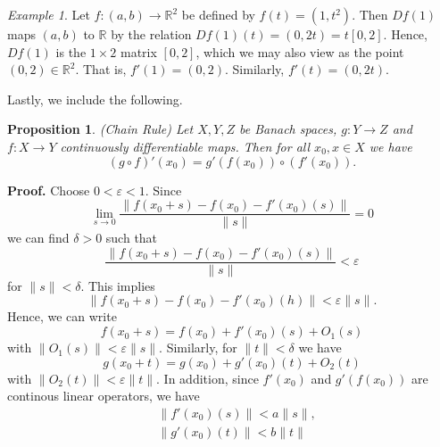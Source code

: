 \documentclass[12pt,reqno]{amsart}
\numberwithin{equation}{section}  %
\numberwithin{figure}{section}
\newcommand{\rr}{\mathbb{R}}
\newcommand{\ee}{\varepsilon}
\theoremstyle{plain}
\newtheorem{proposition}{Proposition}
\theoremstyle{definition}
\theoremstyle{remark}
\newtheorem{example}{Example}
\begin{document}
%
%
%
%
%
%
%
%
%
%
%
\begin{example}
Let $f: (a,b) \to \rr^2$ be defined by $f(t) = (1, t^2)$. Then $Df(1)$ maps
$(a,b)$ to $\rr$ by the relation $Df(1)(t) = (0, 2t) = t[0, 2]$. Hence, $Df(1)$ is the $1
\times 2$ matrix $[0,2]$, which we may also view as the point $(0,2) \in \rr^2$.
That is, $f'(1) = (0,2)$. Similarly, $f'(t) = (0,2t)$.
\end{example}

Lastly, we include the following.
%
%
\begin{proposition}
		(Chain Rule) Let $X,Y,Z$ be Banach spaces, $g: Y \to Z$ and $f:
		X \to Y$ continuously differentiable maps. Then for all $x_0,
		x \in X$ we have \begin{equation*} (g \circ f)' (x_0) =
			g'(f(x_0)) \circ (f'(x_0)).
		\end{equation*} 
	\end{proposition}
			{\bf Proof.} Choose $0<\ee<1$. Since 
			\begin{equation*}
				\lim_{s \to 0} \frac{\|f (x_0 + s) - f(x_0) -
				f'(x_0)(s)\|}{\|s\|} = 0
			\end{equation*}
			we can find $\delta > 0$ such that 
			\begin{equation*}
				\frac{\|f (x_0 + s) - f(x_0) -
				f'(x_0)(s)\|}{\|s\|} < \ee
			\end{equation*}
			for $\|s\| < \delta$. This implies
			\begin{equation*}
				\|f(x_0 + s) - f(x_0) - f'(x_0)(h) \| < \ee \|s\|.
			\end{equation*}
			Hence, we can write
			\begin{equation*}
				f(x_0 + s) = f(x_0) + f'(x_0)(s) + O_1(s)
			\end{equation*}
			with $\|O_1(s)\| < \ee \|s\|$. Similarly, for $\|t\| <
			\delta$ we have 
			\begin{equation*}
				g(x_0 + t) = g(x_0) + g'(x_0)(t)+ O_2(t)
			\end{equation*}
			with $\|O_2(t)\| < \ee \|t\|$. In addition, since $f'(x_0)$
			and $g'(f(x_0))$ are continous linear operators, we have
			\begin{equation*}
				\begin{split}
					&\|f'(x_0)(s) \| < a \|s \|,
					\\
					&\|g'(x_0)(t) \| < b \|t \|
				\end{split}
			\end{equation*}
\end{document}
